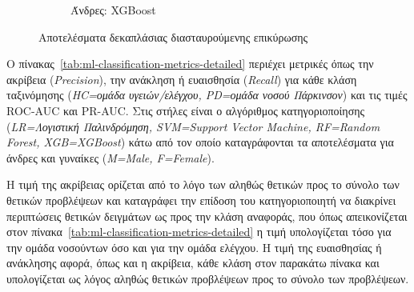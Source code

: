 \documentclass[12pt]{report}
\begin{document}
\begin{figure}[H]
\begin{subfigure}[b]{0.48\textwidth}
                        \caption{Άνδρες: XGBoost}
                        \label{stratified_Male_50-70_XGBOOST_useSMOTE_False_k_fold_validation}
                    \end{subfigure}
                    \vspace{-0.5cm}
                    \caption{Αποτελέσματα δεκαπλάσιας διασταυρούμενης επικύρωσης}
                    \label{fig:ml-algorithms-k-fold-validation}               
                \end{figure}
            \newpage
                Ο πίνακας~\ref{tab:ml-classification-metrics-detailed} περιέχει μετρικές όπως την ακρίβεια (\emph{Precision}), την ανάκληση ή ευαισθησία (\emph{Recall}) για κάθε κλάση ταξινόμησης (\emph{HC=ομάδα υγειών/ελέγχου, PD=ομάδα νοσού Πάρκινσον}) και τις τιμές ROC-AUC και PR-AUC. Στις στήλες είναι ο αλγόριθμος κατηγοριοποίησης (\emph{LR=Λογιστική Παλινδρόμηση, SVM=Support Vector Machine, RF=Random Forest, XGB=XGBoost}) κάτω από τον οποίο καταγράφονται τα αποτελέσματα για άνδρες και γυναίκες (\emph{M=Male, F=Female}). 
            \par
                Η τιμή της ακρίβειας ορίζεται από το λόγο των αληθώς θετικών προς το σύνολο των θετικών προβλέψεων και καταγράφει την επίδοση του κατηγοριοποιητή να διακρίνει περιπτώσεις θετικών δειγμάτων ως προς την κλάση αναφοράς, που όπως απεικονίζεται στον πίνακα~\ref{tab:ml-classification-metrics-detailed} η τιμή υπολογίζεται τόσο για την ομάδα νοσούντων όσο και για την ομάδα ελέγχου. Η τιμή της ευαισθησίας ή ανάκλησης αφορά, όπως και η ακρίβεια, κάθε κλάση στον παρακάτω πίνακα και υπολογίζεται ως λόγος αληθώς θετικών προβλέψεων προς το σύνολο των προβλέψεων.
\end{document}
